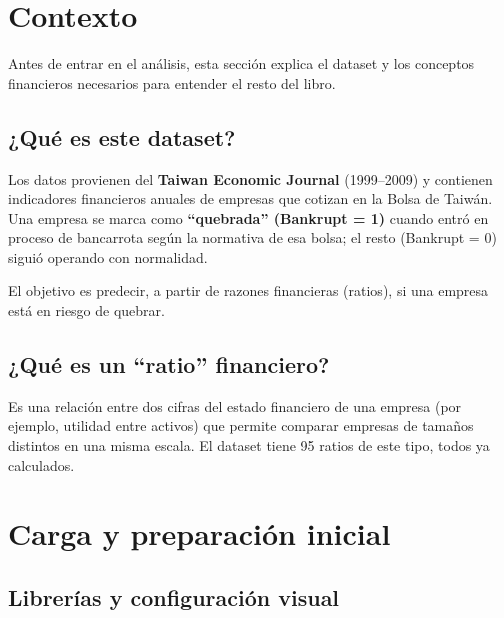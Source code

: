 \documentclass[
]{book}
\begin{document}
\chapter{Contexto}\label{contexto}

Antes de entrar en el análisis, esta sección explica el dataset y los conceptos
financieros necesarios para entender el resto del libro.

\section{¿Qué es este dataset?}\label{quuxe9-es-este-dataset}

Los datos provienen del \textbf{Taiwan Economic Journal} (1999--2009) y contienen indicadores
financieros anuales de empresas que cotizan en la Bolsa de Taiwán. Una empresa se marca
como \textbf{``quebrada'' (Bankrupt = 1)} cuando entró en proceso de bancarrota según la
normativa de esa bolsa; el resto (Bankrupt = 0) siguió operando con normalidad.

El objetivo es predecir, a partir de razones financieras (ratios), si una empresa
está en riesgo de quebrar.

\section{¿Qué es un ``ratio'' financiero?}\label{quuxe9-es-un-ratio-financiero}

Es una relación entre dos cifras del estado financiero de una empresa (por ejemplo,
utilidad entre activos) que permite comparar empresas de tamaños distintos en una
misma escala. El dataset tiene 95 ratios de este tipo, todos ya calculados.

\chapter{Carga y preparación inicial}\label{carga-y-preparaciuxf3n-inicial}

\section{Librerías y configuración visual}\label{libreruxedas-y-configuraciuxf3n-visual}
\end{document}
